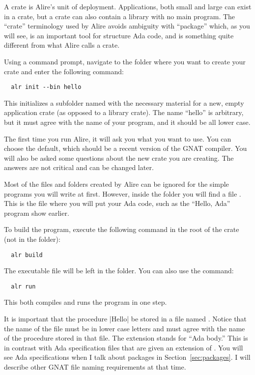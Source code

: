 A crate is Alire's unit of deployment. Applications, both small and large can exist in a crate,
but a crate can also contain a library with no main program. The ``crate'' terminology used by
Alire avoids ambiguity with ``package'' which, as you will see, is an important tool for
structure Ada code, and is something quite different from what Alire calls a crate.

Using a command prompt, navigate to the folder where you want to create your crate and
enter the following command:

\begin{Verbatim}
  alr init --bin hello
\end{Verbatim}

\noindent This initializes a subfolder named  with the necessary material for a
new, empty application crate (as opposed to a library crate). The name ``hello'' is arbitrary,
but it must agree with the name of your program, and it should be all lower case.

The first time you run Alire, it will ask you what  you want to use. You can
choose the default, which should be a recent version of the GNAT compiler. You will also be
asked some questions about the new crate you are creating. The answers are not critical and can
be changed later.

Most of the files and folders created by Alire can be ignored for the simple programs you will
write at first. However, inside the  folder you will find a file
. This is the file where you will put your Ada code, such as the
``Hello, Ada'' program show earlier.

To build the program, execute the following command in the root of the crate (not in the
 folder): 

\begin{Verbatim}
  alr build
\end{Verbatim}

\noindent The executable file will be left in the  folder. You can also use the
command:

\begin{Verbatim}
  alr run
\end{Verbatim}

\noindent This both compiles and runs the program in one step.

It is important that the procedure |Hello| be stored in a file named .
Notice that the name of the file must be in lower case letters and must agree with the name of
the procedure stored in that file. The  extension stands for ``Ada body.'' This is
in contrast with Ada specification files that are given an extension of . You will
see Ada specifications when I talk about packages in Section~\ref{sec:packages}. I will describe
other GNAT file naming requirements at that time.

